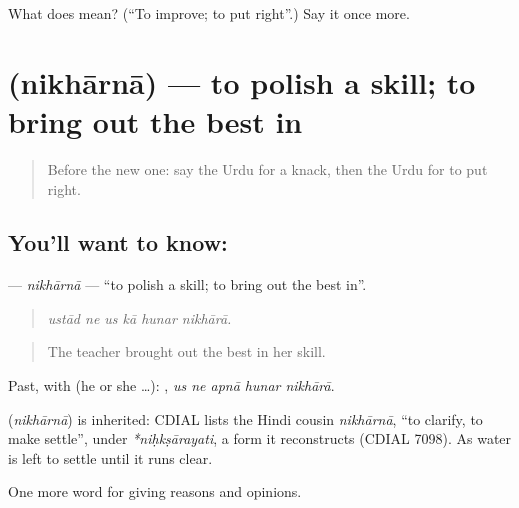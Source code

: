 \begin{tcolorbox}[breakable,colback=teal!4,colframe=teal!35!black,title={Before you move on}]
What does  mean? (\textquotedblleft{}To improve; to put right\textquotedblright{}.) Say it once more.
\end{tcolorbox}
\section[\texorpdfstring{\ur{نکھارنا} (nikhārnā)}{نکھارنا (nikhārnā)}]{ (nikhārnā) — to polish a skill; to bring out the best in}

\label{lesson:UR-C356-nikharna}



\begin{quote}
Before the new one: say the Urdu for a knack, then the Urdu for to put right.
\end{quote}

\subsection*{You'll want to know: }
\textbf{} — \emph{nikhārnā} — \textquotedblleft{}to polish a skill; to bring out the best in\textquotedblright{}.

\begin{quote}
     
\end{quote}

\begin{quote}
\emph{ustād ne us kā hunar nikhārā.}
\end{quote}

\begin{quote}
The teacher brought out the best in her skill.
\end{quote}

Past, with  (he or she …):     , \emph{us ne apnā hunar nikhārā}.

\begin{cousinweb}
\textbf{} (\emph{nikhārnā}) is inherited: CDIAL lists the Hindi cousin \emph{nikhārnā}, \textquotedblleft{}to clarify, to make settle\textquotedblright{}, under \emph{*niḥkṣārayati}, a form it reconstructs (CDIAL 7098). As water is left to settle until it runs clear.
\end{cousinweb}

\begin{grammarlens}[title={What you've built}]
One more word for giving reasons and opinions.
\end{grammarlens}

